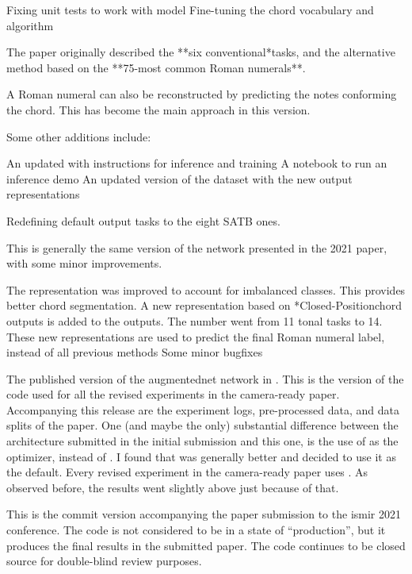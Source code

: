 Fixing unit tests to work with  model
Fine-tuning the chord vocabulary and
 algorithm


The paper originally described the **six conventional*tasks,
and the alternative method based on the **75-most common
Roman numerals**.

A Roman numeral can also be reconstructed by predicting the
notes conforming the chord. This has become the main
approach in this version.

Some other additions include:

An updated  with instructions for inference and
training A notebook to run an inference demo An updated
version of the dataset with the new output representations

Redefining default output tasks to the eight SATB ones.

This is generally the same version of the
 network presented in the 2021 paper,
with some minor improvements.

The  representation was improved to
account for imbalanced classes. This provides better chord
segmentation. A new representation based on
*Closed-Positionchord outputs is added to the outputs. The
number went from 11 tonal tasks to 14. These new
representations are used to predict the final Roman numeral
label, instead of all previous methods Some minor bugfixes

The published version of the \gls{augmentednet} network in
\textcite{napoleslopez2021augmentednet}. This is the version
of the code used for all the revised experiments in the
camera-ready paper. Accompanying this release are the
experiment logs, pre-processed data, and data splits of the
paper. One (and maybe the only) substantial difference
between the architecture submitted in the initial submission
and this one, is the use of  as the optimizer,
instead of . I found that  was
generally better and decided to use it as the default. Every
revised experiment in the camera-ready paper uses
. As observed before, the results went
slightly above just because of that.

This is the commit version accompanying the paper submission
to the \gls{ismir} 2021 conference. The code is not
considered to be in a state of ``production'', but it
produces the final results in the submitted paper. The code
continues to be closed source for double-blind review
purposes.

